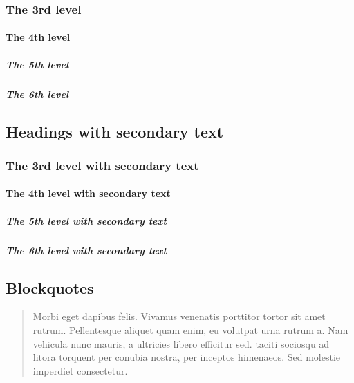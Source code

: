 \documentclass[letterpaper,10pt,english]{sphinxmanual}
\begin{document}
\subsubsection{The 3rd level}
\label{\detokenize{markdown:the-3rd-level}}

\paragraph{The 4th level}
\label{\detokenize{markdown:the-4th-level}}

\subparagraph{The 5th level}
\label{\detokenize{markdown:the-5th-level}}

\subparagraph{The 6th level}
\label{\detokenize{markdown:the-6th-level}}

\subsection{Headings with secondary text}
\label{\detokenize{markdown:headings-small-with-secondary-text-small}}

\subsubsection{The 3rd level with secondary text}
\label{\detokenize{markdown:the-3rd-level-small-with-secondary-text-small}}

\paragraph{The 4th level with secondary text}
\label{\detokenize{markdown:the-4th-level-small-with-secondary-text-small}}

\subparagraph{The 5th level with secondary text}
\label{\detokenize{markdown:the-5th-level-small-with-secondary-text-small}}

\subparagraph{The 6th level with secondary text}
\label{\detokenize{markdown:the-6th-level-small-with-secondary-text-small}}

\subsection{Blockquotes}
\label{\detokenize{markdown:blockquotes}}\begin{quote}

Morbi eget dapibus felis. Vivamus venenatis porttitor tortor sit amet rutrum.
Pellentesque aliquet quam enim, eu volutpat urna rutrum a. Nam vehicula nunc
mauris, a ultricies libero efficitur sed.  taciti sociosqu ad
litora torquent per conubia nostra, per inceptos himenaeos. Sed molestie
imperdiet consectetur.
\end{quote}
\end{document}

